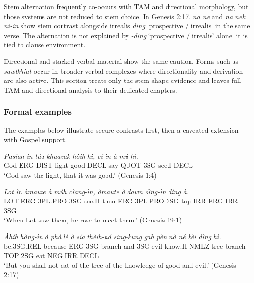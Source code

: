 \documentclass[
  11pt,
  a4paper,
]{article}
\newcommand{\tdim}[1]{\textit{#1}}
\newcommand{\tdimword}[1]{\textit{#1}}
\renewcommand{\textsc}[1]{{\footnotesize\MakeUppercase{#1}}}
\newcommand{\glossquote}[1]{`#1'}
\begin{document}
Stem alternation frequently co-occurs with TAM and directional
morphology, but those systems are not reduced to stem choice. In Genesis
2:17, \tdim{na ne} and \tdim{na nek ni-in} show stem contrast alongside
irrealis \tdim{ding} \glossquote{prospective / irrealis} in the same
verse. The alternation is not explained by \tdim{-ding}
\glossquote{prospective / irrealis} alone; it is tied to clause
environment.

Directional and stacked verbal material show the same caution. Forms
such as \tdim{sawlkhiat} occur in broader verbal complexes where
directionality and derivation are also active. This section treats only
the stem-shape evidence and leaves full TAM and directional analysis to
their dedicated chapters.

\subsubsection{Formal examples}\label{formal-examples}

The examples below illustrate secure contrasts first, then a caveated
extension with Gospel support.

\begin{exe}
\ex \label{ex:stem-mu-gen1}
\gll \tdimword{Pasian} \tdimword{ìn} \tdimword{túa} \tdimword{khuavak} \tdimword{hòih} \tdimword{hì,} \tdimword{cí-ìn} \tdimword{à} \tdimword{mú} \tdimword{hì.} \\
     God \textsc{erg} \textsc{dist} light good \textsc{decl} say-\textsc{quot} \textsc{3sg} see.\textsc{i} \textsc{decl} \\
\glt \glossquote{God saw the light, that it was good.} (Genesis 1:4)
\end{exe}

\begin{exe}
\ex \label{ex:stem-muh-gen19}
\gll \tdimword{Lot} \tdimword{ìn} \tdimword{àmaute} \tdimword{à} \tdimword{mùh} \tdimword{cìang-ìn,} \tdimword{àmaute} \tdimword{à} \tdimword{dawn} \tdimword{dìng-ìn} \tdimword{dìng} \tdimword{à.} \\
     \textsc{lot} \textsc{erg} \textsc{3pl}.\textsc{pro} \textsc{3sg} see.\textsc{ii} then-\textsc{erg} \textsc{3pl}.\textsc{pro} \textsc{3sg} top \textsc{irr}-\textsc{erg} \textsc{irr} \textsc{3sg} \\
\glt \glossquote{When Lot saw them, he rose to meet them.} (Genesis 19:1)
\end{exe}

\begin{exe}
\ex \label{ex:stem-ne-gen2}
\gll \tdimword{Àhìh} \tdimword{hàng-ìn} \tdimword{à} \tdimword{phà} \tdimword{lè} \tdimword{à} \tdimword{sía} \tdimword{thèih-ná} \tdimword{sing-kung} \tdimword{gah} \tdimword{pèn} \tdimword{nà} \tdimword{né} \tdimword{kèi} \tdimword{dìng} \tdimword{hì.} \\
     be.\textsc{3sg}.\textsc{rel} because-\textsc{erg} \textsc{3sg} branch and \textsc{3sg} evil know.\textsc{ii}-\textsc{nmlz} tree branch \textsc{top} \textsc{2sg} eat \textsc{neg} \textsc{irr} \textsc{decl} \\
\glt \glossquote{But you shall not eat of the tree of the knowledge of good and evil.} (Genesis 2:17)
\end{exe}
\end{document}
